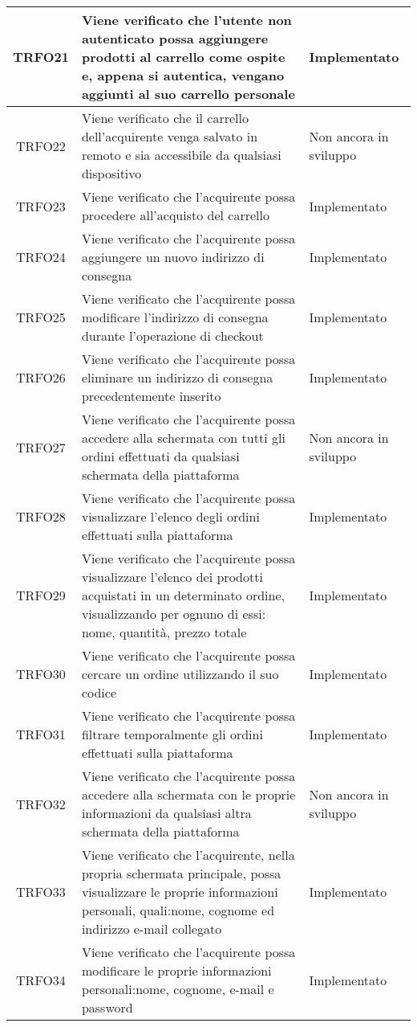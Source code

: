 \begin{longtable}{|c| C{10cm} |C{3cm}|}
	TRFO21 & Viene verificato che l'utente non autenticato possa aggiungere prodotti al carrello come ospite e, appena si autentica, vengano aggiunti al suo carrello personale & Implementato\\ \hline
	TRFO22 & Viene verificato che il carrello dell'acquirente venga salvato in remoto e sia accessibile da qualsiasi dispositivo & Non ancora in sviluppo\\ \hline
   	TRFO23 & Viene verificato che l'acquirente possa procedere all'acquisto del carrello & Implementato\\ \hline
   	TRFO24 & Viene verificato che l'acquirente possa aggiungere un nuovo indirizzo di consegna & Implementato\\ \hline
   	TRFO25 & Viene verificato che l'acquirente possa modificare l'indirizzo di consegna durante l'operazione di checkout & Implementato\\ \hline
	TRFO26 & Viene verificato che l'acquirente possa eliminare un indirizzo di consegna precedentemente inserito & Implementato\\ \hline
	TRFO27 & Viene verificato che l'acquirente possa accedere alla schermata con tutti gli ordini effettuati da qualsiasi schermata della piattaforma & Non ancora in sviluppo \\ \hline
	TRFO28 & Viene verificato che l'acquirente possa visualizzare l'elenco degli ordini effettuati sulla piattaforma & Implementato\\ \hline
	TRFO29 & Viene verificato che l'acquirente possa visualizzare l'elenco dei prodotti acquistati in un determinato ordine, visualizzando per ognuno di essi: nome, quantità, prezzo totale & Implementato\\ \hline
	TRFO30 & Viene verificato che l'acquirente possa cercare un ordine utilizzando il suo codice & Implementato\\ \hline
	TRFO31 & Viene verificato che l'acquirente possa filtrare temporalmente gli ordini effettuati sulla piattaforma & Implementato\\ \hline
	TRFO32 & Viene verificato che l'acquirente possa accedere alla schermata con le proprie informazioni da qualsiasi altra schermata della piattaforma & Non ancora in sviluppo\\ \hline
	TRFO33 & Viene verificato che l'acquirente, nella propria schermata principale, possa visualizzare le proprie informazioni personali, quali:nome, cognome ed indirizzo e-mail collegato & Implementato\\ \hline
	TRFO34 & Viene verificato che l'acquirente possa modificare le proprie informazioni personali:nome, cognome, e-mail e password & Implementato\\ \hline

\end{longtable}
